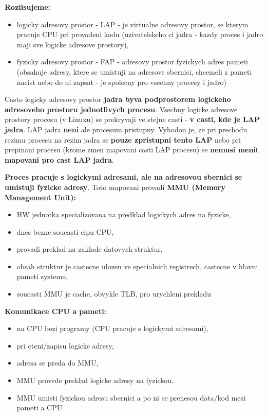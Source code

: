 \documentclass[a4paper, 11pt]{article}
\begin{document}
\textbf{Rozlisujeme:}
\begin{itemize}
    \item logicky adresovy prostor - LAP - je virtualne adresovy prostor, se kterym pracuje CPU pri provadeni kodu (uzivatelskeho ci jadra - kazdy proces i jadro maji sve logicke adresove prostory),
    \item fyzicky adresovy prostor - FAP - adresovy prostor fyzickych adres pameti (obsahuje adresy, ktere se umistuji na adresove sbernici, chcemeli z pameti nacist nebo do ni zapsat - je spolecny pro vsechny procesy i jadro) \\
\end{itemize}

Casto logicky adresovy prostor \textbf{jadra byva podprostorem logickeho adresoveho prostoru jednotlivych procesu}. Vsechny logicke adresove prostory procesu (v Linuxu) se prekryvaji ve stejne casti - \textbf{v casti, kde je LAP jadra}. LAP jadra \textbf{neni} ale procesum pristupny. Vyhodou je, ze pri prechodu rezimu procesu na rezim jadra se \textbf{pouze zpristupni tento LAP} nebo pri prepinani procesu (krome zmen mapovani casti LAP procesu) se \textbf{nemusi menit mapovani pro cast LAP jadra}.

\textbf{Proces pracuje s logickymi adresami, ale na adresovou sbernici se umistuji fyzicke adresy}. Toto mapovani provadi \textbf{MMU (Memory Management Unit):}
\begin{itemize}
    \item HW jednotka specializovana na predklad logickych adres na fyzicke, 
    \item dnes bezne soucasti cipu CPU,
    \item provadi preklad na zaklade datovych struktur,
    \item obsah struktur je castecne ulozen ve specialnich registrech, castecne v hlavni pameti systemu,
    \item soucasti MMU je cache, obvykle TLB, pro urychleni prekladu \\
\end{itemize}

\textbf{Komunikace CPU a pameti:}
\begin{itemize}
    \item na CPU bezi programy (CPU pracuje s logickymi adresami),
    \item pri cteni/zapisu logicke adresy,
    \item adresa se preda do MMU,
    \item MMU provede preklad logicke adresy na fyzickou,
    \item MMU umisti fyzickou adresu sbernici a po ni se prenesou data/kod mezi pameti a CPU \\
\end{itemize}
\end{document}
